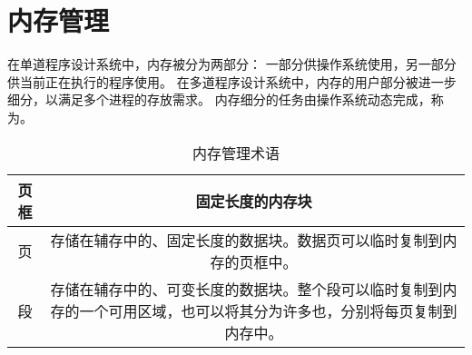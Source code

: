 
\chapter{内存管理}
{
    在单道程序设计系统中，内存被分为两部分：
    一部分供操作系统使用，另一部分供当前正在执行的程序使用。
    在多道程序设计系统中，内存的用户部分被进一步细分，以满足多个进程的存放需求。
    内存细分的任务由操作系统动态完成，称为。

    \begin{table}[htb]
        \centering

        \caption{内存管理术语}

        \begin{tabular}{c|c}
            \hline
            页框 & 固定长度的内存块 \\
            \hline
            页 & 存储在辅存中的、固定长度的数据块。数据页可以临时复制到内存的页框中。 \\
            \hline
            段 & 存储在辅存中的、可变长度的数据块。整个段可以临时复制到内存的一个可用区域，也可以将其分为许多也，分别将每页复制到内存中。 \\
            \hline
        \end{tabular}
    \end{table}

    
}

\cleardoublepage

\endinput
